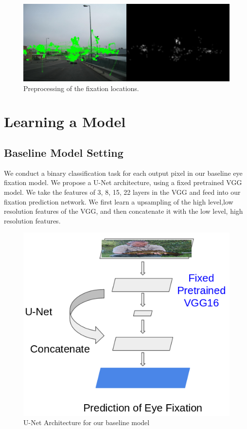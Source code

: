 \documentclass[10pt,twocolumn,letterpaper]{article}
\begin{document}
\begin{figure}
	\begin{center}
		\includegraphics[width=\columnwidth]{figures/preprocess.png}
	\end{center}
	\caption{Preprocessing of the fixation locations.}
	\label{fig:preprocess}
\end{figure}


\section{Learning a Model}
\subsection{Baseline Model Setting}
We conduct a binary classification task for each output pixel in our baseline eye fixation model. We propose a U-Net architecture, using a fixed pretrained VGG model. We take the features of 3, 8, 15, 22 layers in the VGG and feed into our fixation prediction network. We first learn a upsampling of the high level,low resolution features of the VGG, and then concatenate it with the low level, high resolution features.

 \begin{figure}
	\begin{center}
		\includegraphics[width=\columnwidth]{figures/architecture_bl.png}
	\end{center}
	\caption{U-Net Architecture for our baseline model}
	\label{fig:unet}
\end{figure}
\end{document}
